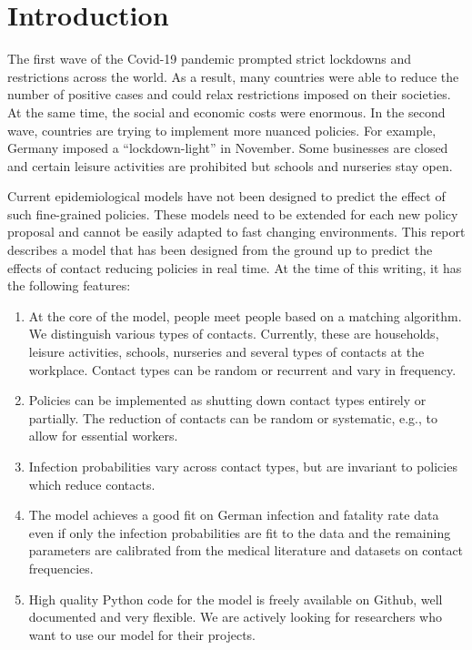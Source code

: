 \section{Introduction}
\label{sec:introduction}

The first wave of the Covid-19 pandemic prompted strict lockdowns and restrictions across the world. As a result, many countries were able to reduce the number of positive cases and could relax restrictions imposed on their societies. At the same time, the social and economic costs were enormous. In the second wave, countries are trying to implement more nuanced policies. For example, Germany imposed a ``lockdown-light'' in November. Some businesses are closed and certain leisure activities are prohibited but schools and nurseries stay open.

Current epidemiological models have not been designed to predict the effect of such fine-grained policies. These models need to be extended for each new policy proposal and cannot be easily adapted to fast changing environments. This report describes a model that has been designed from the ground up to predict the effects of contact reducing policies in real time. At the time of this writing, it has the following features:

\begin{enumerate}
    \item At the core of the model, people meet people based on a matching algorithm. We distinguish various types of contacts. Currently, these are households, leisure activities, schools, nurseries and several types of contacts at the workplace. Contact types can be random or recurrent and vary in frequency.
    \item Policies can be implemented as shutting down contact types entirely or partially. The reduction of contacts can be random or systematic, e.g., to allow for essential workers.
    \item Infection probabilities vary across contact types, but are invariant to policies which reduce contacts.
    \item The model achieves a good fit on German infection and fatality rate data even if only the infection probabilities are fit to the data and the remaining parameters are calibrated from the medical literature and datasets on contact frequencies.
    \item High quality Python code for the model is freely available on Github, well documented and very flexible\footnotemark. We are actively looking for researchers who want to use our model for their projects.
\end{enumerate}

